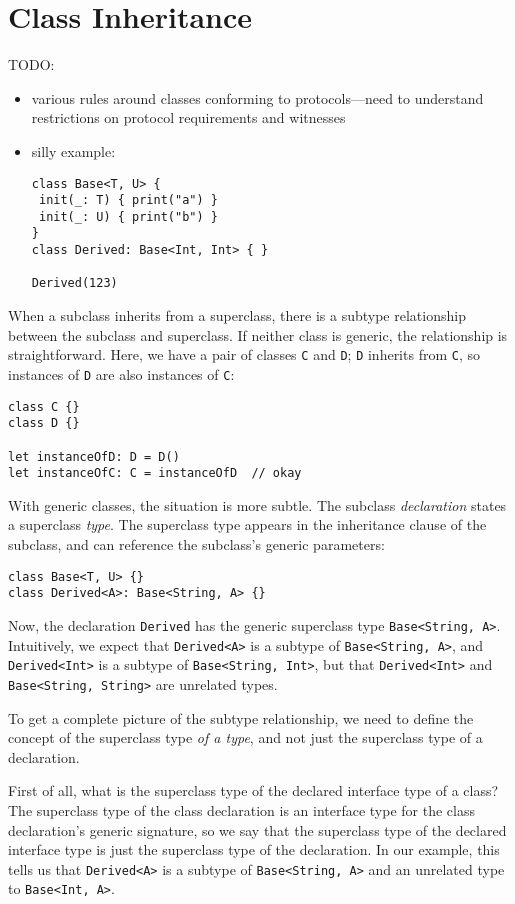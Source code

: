 \documentclass[a4paper,headsepline,bibliography=totoc,toc=flat,fleqn,twoside=semi]{scrbook}
\theoremstyle{definition}
\theoremstyle{definition}
\theoremstyle{definition}
\newcommand{\ifWIP}{\iffalse}
\begin{document}
\chapter{Class Inheritance}\label{classinheritance}

\ifWIP

TODO:
\begin{itemize}
\item various rules around classes conforming to protocols---need to understand restrictions on protocol requirements and witnesses
\item silly example:
\begin{Verbatim}
class Base<T, U> {
 init(_: T) { print("a") }
 init(_: U) { print("b") }
}
class Derived: Base<Int, Int> { }

Derived(123)
\end{Verbatim}
\end{itemize}

When a subclass inherits from a superclass, there is a subtype relationship between the subclass and superclass. If neither class is generic, the relationship is straightforward. Here, we have a pair of classes \texttt{C} and \texttt{D}; \texttt{D} inherits from \texttt{C}, so instances of \texttt{D} are also instances of \texttt{C}:
\begin{Verbatim}
class C {}
class D {}

let instanceOfD: D = D()
let instanceOfC: C = instanceOfD  // okay
\end{Verbatim}
With generic classes, the situation is more subtle. The subclass \emph{declaration} states a superclass \emph{type}. The superclass type appears in the inheritance clause of the subclass, and can reference the subclass's generic parameters:
\begin{Verbatim}
class Base<T, U> {}
class Derived<A>: Base<String, A> {}
\end{Verbatim}
Now, the declaration \texttt{Derived} has the generic superclass type \texttt{Base<String, A>}. Intuitively, we expect that \texttt{Derived<A>} is a subtype of \texttt{Base<String, A>}, and \texttt{Derived<Int>} is a subtype of \texttt{Base<String, Int>}, but that \texttt{Derived<Int>} and \texttt{Base<String, String>} are unrelated types.

To get a complete picture of the subtype relationship, we need to define the concept of the superclass type \emph{of a type}, and not just the superclass type of a declaration.

First of all, what is the superclass type of the declared interface type of a class? The superclass type of the class declaration is an interface type for the class declaration's generic signature, so we say that the superclass type of the declared interface type is just the superclass type of the declaration. In our example, this tells us that \texttt{Derived<A>} is a subtype of \texttt{Base<String, A>} and an unrelated type to \texttt{Base<Int, A>}.
\end{document}
